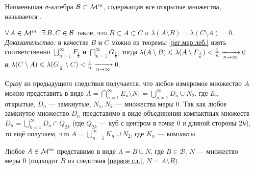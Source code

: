 \begin{opr}
	Наименьшая $\sigma$-алгебра $\mathcal{B} \subset \mathcal{M}^m$, содержащая все открытые множества, называется .
\end{opr}

\begin{slv}[https://www.youtube.com/live/Y10gq1j3ADI?si=pi4XrF5pr-6Jlsva&t=2510]\label{первое сл.}
	$\A A \in \m \E B, C \in \mathcal B$ такие, что $B \subset A \subset C$ и $\lambda(A \setminus B)  = \lambda(C \setminus A) = 0$. \textit{Доказательство:} в качестве $B$ и $C$ можно из теоремы \ref{рег.мер.леб.} взять соответственно $\bigcup\limits_{n = 1}^\infty F_{\frac 1n}$ и $\bigcap\limits_{n = 1}^\infty G_{\frac 1n}$, тогда $\lambda(A \setminus B) \leqslant \lambda(A \setminus F_{\frac 1n}) < \frac 1n \xrightarrow[n \to \infty]{} 0$ и $\lambda(C \setminus A) \leqslant \lambda(G_{\frac 1n} \setminus C) < \frac 1n \xrightarrow[n \to \infty]{} 0$.
\end{slv}

\begin{slv}\label{изм.в виде компакт.}
	Сразу из предыдущего следствия получается, что любое измеримое множество $A$ можно представить в виде $A = \bigcap\limits_{n = 1}^\infty E_n \setminus N_1 = \bigcup\limits_{n = 1}^\infty D_n \cup N_2$, где $E_n$ --- открытые, $D_n$ --- замкнутые, $N_1, N_2$ --- множества меры 0. Так как любое замкнутое множество $D_n$ представимо в виде объединения компактных множеств $D_n = \bigcup\limits_{k = 1}^\infty D_n \cap Q_{2k}$ (где $Q_{2k}$ --- куб с центром в точке 0 и длиной стороны $2k$), то ещё получаем, что $A = \bigcup\limits_{n = 1}^\infty K_n \cup N_2$, где $K_n$ --- компакты.
\end{slv}

\begin{slv}[https://www.youtube.com/live/Y10gq1j3ADI?si=rFm4joBm1-0psrIl&t=2776]
	 Любое $A \in \mathcal{M}^m$ представимо в виде $A = B \cup N$, где $B \in \mathcal{B}$, $N$ --- множество меры 0 (подходит $B$ из следствия \ref{первое сл.}, $N = A \setminus B$).
\end{slv}

